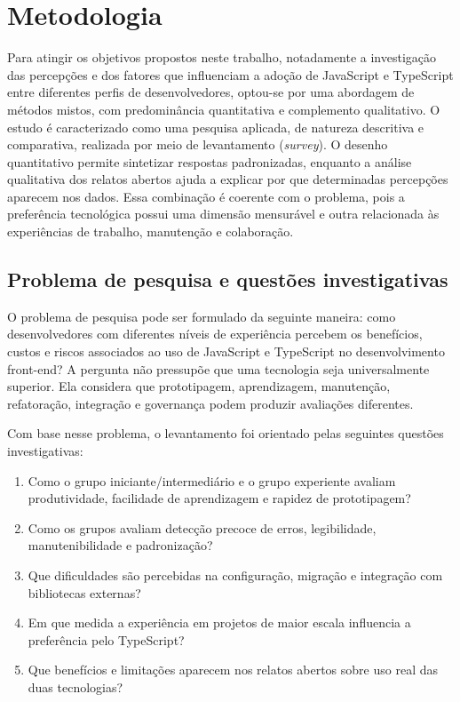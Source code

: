 \chapter{Metodologia}
\label{chap:metodologia}

Para atingir os objetivos propostos neste trabalho, notadamente a investigação das percepções e dos fatores que influenciam a adoção de JavaScript e TypeScript entre diferentes perfis de desenvolvedores, optou-se por uma abordagem de métodos mistos, com predominância quantitativa e complemento qualitativo. O estudo é caracterizado como uma pesquisa aplicada, de natureza descritiva e comparativa, realizada por meio de levantamento (\textit{survey}). O desenho quantitativo permite sintetizar respostas padronizadas, enquanto a análise qualitativa dos relatos abertos ajuda a explicar por que determinadas percepções aparecem nos dados. Essa combinação é coerente com o problema, pois a preferência tecnológica possui uma dimensão mensurável e outra relacionada às experiências de trabalho, manutenção e colaboração.

\section{Problema de pesquisa e questões investigativas}

O problema de pesquisa pode ser formulado da seguinte maneira: como desenvolvedores com diferentes níveis de experiência percebem os benefícios, custos e riscos associados ao uso de JavaScript e TypeScript no desenvolvimento front-end? A pergunta não pressupõe que uma tecnologia seja universalmente superior. Ela considera que prototipagem, aprendizagem, manutenção, refatoração, integração e governança podem produzir avaliações diferentes.

Com base nesse problema, o levantamento foi orientado pelas seguintes questões investigativas:
\begin{enumerate}
	\item Como o grupo iniciante/intermediário e o grupo experiente avaliam produtividade, facilidade de aprendizagem e rapidez de prototipagem?
	\item Como os grupos avaliam detecção precoce de erros, legibilidade, manutenibilidade e padronização?
	\item Que dificuldades são percebidas na configuração, migração e integração com bibliotecas externas?
	\item Em que medida a experiência em projetos de maior escala influencia a preferência pelo TypeScript?
	\item Que benefícios e limitações aparecem nos relatos abertos sobre uso real das duas tecnologias?
\end{enumerate}

